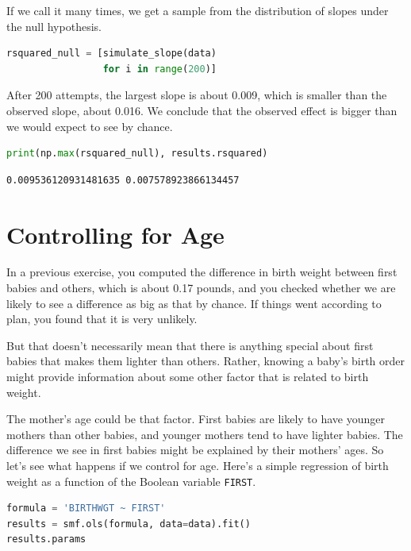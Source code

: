 If we call it many times, we get a sample from the distribution of
slopes under the null hypothesis.

\begin{lstlisting}[language=Python,style=source]
rsquared_null = [simulate_slope(data)
                 for i in range(200)]
\end{lstlisting}

After 200 attempts, the largest slope is about 0.009, which is smaller
than the observed slope, about 0.016. We conclude that the observed
effect is bigger than we would expect to see by chance.

\begin{lstlisting}[language=Python,style=source]
print(np.max(rsquared_null), results.rsquared)
\end{lstlisting}

\begin{lstlisting}[style=output]
0.009536120931481635 0.007578923866134457
\end{lstlisting}

\hypertarget{controlling-for-age}{%
\section{Controlling for Age}\label{controlling-for-age}}

In a previous exercise, you computed the difference in birth weight
between first babies and others, which is about 0.17 pounds, and you
checked whether we are likely to see a difference as big as that by
chance. If things went according to plan, you found that it is very
unlikely.

But that doesn't necessarily mean that there is anything special about
first babies that makes them lighter than others. Rather, knowing a
baby's birth order might provide information about some other factor
that is related to birth weight.

The mother's age could be that factor. First babies are likely to have
younger mothers than other babies, and younger mothers tend to have
lighter babies. The difference we see in first babies might be explained
by their mothers' ages. So let's see what happens if we control for age.
Here's a simple regression of birth weight as a function of the Boolean
variable \passthrough{\lstinline!FIRST!}.

\begin{lstlisting}[language=Python,style=source]
formula = 'BIRTHWGT ~ FIRST'
results = smf.ols(formula, data=data).fit()
results.params
\end{lstlisting}


